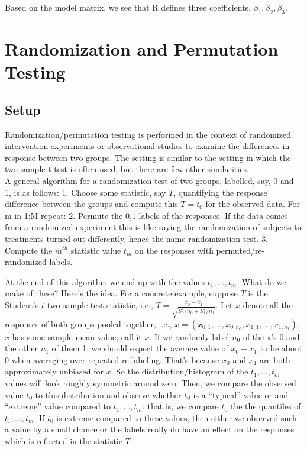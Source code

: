 \documentclass[
]{book}
\begin{document}
Based on the model matrix, we see that R defines three coefficients, \(\beta_1, \beta_2, \beta_3\).

\hypertarget{randomization-and-permutation-testing}{%
\chapter{Randomization and Permutation Testing}\label{randomization-and-permutation-testing}}

\hypertarget{setup}{%
\section{Setup}\label{setup}}

Randomization/permutation testing is performed in the context of randomized intervention experiments or observational studies to examine the differences in response between two groups. The setting is similar to the setting in which the two-sample t-test is often used, but there are few other similarities.\\
A general algorithm for a randomization test of two groups, labelled, say, 0 and 1, is as follows:
1. Choose some statistic, say \(T\), quantifying the response difference between the groups and compute this \(T = t_0\) for the observed data.
For m in 1:M repeat:
2. Permute the 0,1 labels of the responses. If the data comes from a randomized experiment this is like saying the randomization of subjects to treatments turned out differently, hence the name randomization test.
3. Compute the \(m^{th}\) statistic value \(t_m\) on the responses with permuted/re-randomized labels.

At the end of this algorithm we end up with the values \(t_1, \ldots, t_m\). What do we make of these? Here's the idea. For a concrete example, suppose \(T\) is the Student's \(t\) two-sample test statistic, i.e., \(T = \frac{\overline x_0 - \overline x_1}{\sqrt{S_0^2/n_0 + S_1^2/n_1}}\). Let \(x\) denote all the responses of both groups pooled together, i.e., \(x = (x_{0,1}, ..., x_{0,n_0}, x_{1,1}, ...,x_{1,n_1})\). \(x\) has some sample mean value; call it \(\overline x\). If we randomly label \(n_0\) of the x's 0 and the other \(n_1\) of them 1, we should expect the average value of \(\overline x_0 - \overline x_1\) to be about 0 when averaging over repeated re-labeling. That's because \(\overline x_0\) and \(\overline x_1\) are both approximately unbiased for \(\overline x\). So the distribution/histogram of the \(t_1, ..., t_m\) values will look roughly symmetric around zero. Then, we compare the observed value \(t_0\) to this distribution and observe whether \(t_0\) is a ``typical'' value or and ``extreme'' value compared to \(t_1, ..., t_m\); that is, we compare \(t_0\) the the quantiles of \(t_1, ..., t_m\). If \(t_0\) is extreme compared to these values, then either we observed such a value by a small chance or the labels really do have an effect on the responses which is reflected in the statistic \(T\).
\end{document}
